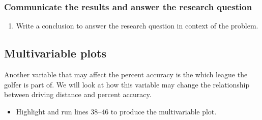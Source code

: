 \documentclass[
]{report}
\providecommand{\tightlist}{%
  \setlength{\itemsep}{0pt}\setlength{\parskip}{0pt}}
\begin{document}
\vspace{.8in}

\hypertarget{communicate-the-results-and-answer-the-research-question-5}{%
\subsubsection*{Communicate the results and answer the research question}\label{communicate-the-results-and-answer-the-research-question-5}}

\begin{enumerate}
\def\labelenumi{\arabic{enumi}.}
\setcounter{enumi}{13}
\tightlist
\item
  Write a conclusion to answer the research question in context of the problem.
\end{enumerate}

\vspace{.8in}

\newpage

\hypertarget{multivariable-plots-2}{%
\subsection*{Multivariable plots}\label{multivariable-plots-2}}

Another variable that may affect the percent accuracy is the which league the golfer is part of. We will look at how this variable may change the relationship between driving distance and percent accuracy.

\begin{itemize}
\tightlist
\item
  Highlight and run lines 38--46 to produce the multivariable plot.
\end{itemize}
\end{document}
